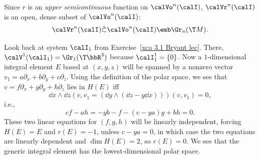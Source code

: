  Since $r$ is an \emph{upper semicontinuous} function on $\calVo^n(\calI)$, $\calVr^n(\calI)$ is an open, dense subset of $\calVo^n(\calI)$:
\[\calVr^n(\calI)\mathring{\subset}\calVo^n(\calI)\emb \Gr_n(\T M).\]


\begin{example}
    Look back at system $\calI_1$ from Exercise~\ref{xca 3.1 Bryant lec}. There, $\calV^1(\calI_1)=\Gr_1(\T \bbR^3)$ because $\calI_1^1=\{0\}$. Now a $1$-dimensional integral element $E$ based at $(x,y,z)$ will be spanned by a nonzero vector $v_1=a\partial_x+b\partial_y+c\partial_z$. Using the definition of the polar space, we see that $v=f\partial_x+g\partial_y+h\partial_z$ lies in $H(E)$ iff 
    \[\dd x\wedge\dd z(v,v_1=(\dd y\wedge(\dd z-y\dd x)))(v,v_1)=0,\] 
    i.e., 
    \[cf-ah=-yb-f-(c-ya)g+bh=0.\]
    These two linear equations for $(f,g,h)$ will be linearly independent, forcing $H(E)=E$ and $r(E)=-1$, unless $c-ya=0$, in which case the two equations are linearly dependent and $\dim H(E)=2$, so $r(E)=0$. We see that the generic integral element has the lowest-dimensional polar space.
\end{example}

